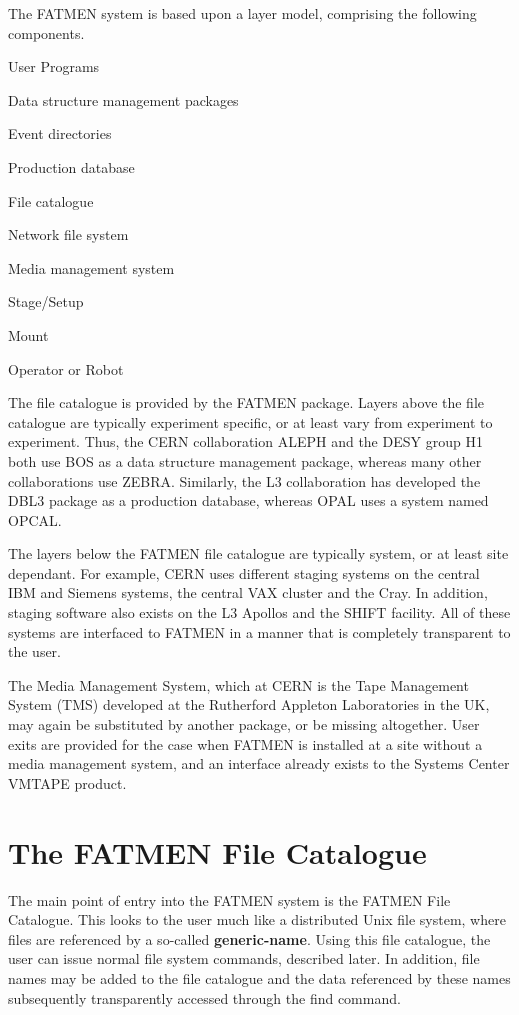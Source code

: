 The FATMEN system is based upon a layer model, comprising the
following components.
\begin{UL}
\item User Programs
\item Data structure management packages
\item Event directories
\item Production database
\item File catalogue
\item Network file system
\item Media management system
\item Stage/Setup
\item Mount
\item Operator or Robot
\end{UL}
\par
The file catalogue is provided by the FATMEN package. Layers
above the file catalogue are typically experiment specific,
or at least vary from experiment to experiment. Thus, the
CERN collaboration ALEPH and the DESY group H1 both use
BOS as a data structure management package, whereas
many other collaborations use ZEBRA. Similarly, the
L3 collaboration has developed the DBL3 package as
a production database, whereas OPAL uses a system named
OPCAL.
\par
The layers below the FATMEN file catalogue are typically
system, or at least site dependant. For example,
CERN uses different staging systems on the central
IBM and Siemens systems, the central VAX cluster and the
Cray. In addition, staging software also exists on
the L3 Apollos and the SHIFT facility. 
All of these systems are interfaced to FATMEN in
a manner that is completely transparent to the user.
\par
The Media Management System, which at CERN is the
Tape Management System (TMS) developed at the
Rutherford Appleton Laboratories in the UK,
may again be substituted by another package,
or be missing altogether. User exits are provided
for the case when FATMEN is installed
at a site without a media management system,
and an interface already exists to the Systems
Center VMTAPE product.

\chapter{The FATMEN File Catalogue}

The main point of entry into the FATMEN system
is the FATMEN File Catalogue.
This looks to the user much like a distributed Unix file system, where
files are referenced by a so-called {\bf generic-name}. Using this
file catalogue, the user can issue normal file system commands, described
later.
In addition, file names may be added to the file catalogue
and the data referenced by these names 
subsequently transparently accessed through the find command.
